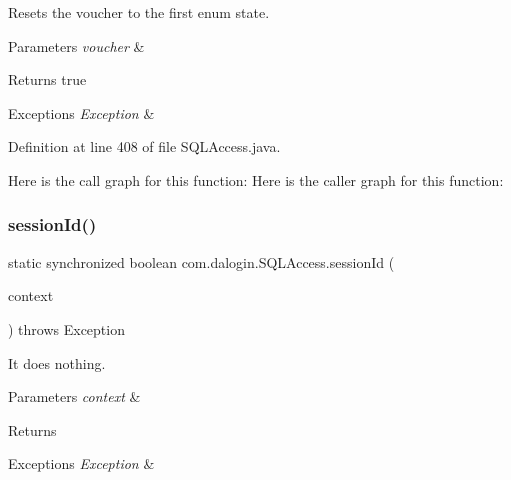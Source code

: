 Resets the voucher to the first enum state.


\begin{DoxyParams}{Parameters}
{\em voucher} & \\
\hline
\end{DoxyParams}
\begin{DoxyReturn}{Returns}
true 
\end{DoxyReturn}

\begin{DoxyExceptions}{Exceptions}
{\em Exception} & \\
\hline
\end{DoxyExceptions}


Definition at line 408 of file S\+Q\+L\+Access.\+java.

Here is the call graph for this function\+:
Here is the caller graph for this function\+:
\mbox{\label{classcom_1_1dalogin_1_1_s_q_l_access_ade5ec7d23b3cc42804c39af135eb1551}} 
\subsubsection{\texorpdfstring{session\+Id()}{sessionId()}}
{\footnotesize\ttfamily static synchronized boolean com.\+dalogin.\+S\+Q\+L\+Access.\+session\+Id (\begin{DoxyParamCaption}\item[{Servlet\+Context}]{context }\end{DoxyParamCaption}) throws Exception\hspace{0.3cm}{\ttfamily [static]}}

It does nothing.


\begin{DoxyParams}{Parameters}
{\em context} & \\
\hline
\end{DoxyParams}
\begin{DoxyReturn}{Returns}

\end{DoxyReturn}

\begin{DoxyExceptions}{Exceptions}
{\em Exception} & \\
\hline
\end{DoxyExceptions}


